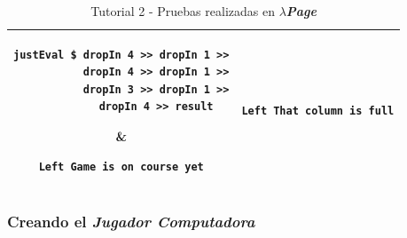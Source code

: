 \documentclass[a4paper]{article}
\newcommand{\hpage}{\textbf{\textsl{$\lambda$Page}}}
\begin{document}
\begin{table}[hp]
\begin{center}
\begin{tabular}{@{} cc @{}}
\begin{lstlisting}
justEval $ dropIn 4 >> dropIn 1 >>
           dropIn 4 >> dropIn 1 >>
           dropIn 3 >> dropIn 1 >>
           dropIn 4 >> result
\end{lstlisting} &
\begin{lstlisting}
Left Game is on course yet
\end{lstlisting} \\[1.5em]

\begin{lstlisting}
justEval $ dropIn 1 >> dropIn 1 >>
           dropIn 1 >> dropIn 1 >>
           dropIn 1 >> dropIn 1 >>
           dropIn 1 >> dropIn 1
\end{lstlisting} &
\begin{lstlisting}
Left That column is full
\end{lstlisting} \\[1.5em]

			\bottomrule
		\end{tabular}
		\caption{Tutorial 2 - Pruebas realizadas en \hpage}
		\label{tut206}
	\end{center}
\end{table}
\lstset{language=haskell, frame=single, tabsize=4}

\newpage
\subsubsection{Creando el \textsl{Jugador Computadora}}
\end{document}
